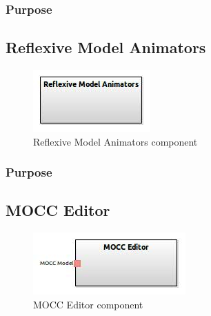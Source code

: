 \documentclass{gemoc} %
\begin{document}
\subsubsection{Purpose}



\subsection{Reflexive Model Animators}

\begin{figure}[htp]
	\begin{center}
	\includegraphics*[trim=0.0cm 0.0cm 0cm 0.0cm, clip=true, scale=1.0]{../images/generated/Generated_Reflexive Model Animators.jpg}
	\caption{Reflexive Model Animators component}
	\end{center}
\end{figure}

\subsubsection{Purpose}



\subsection{MOCC Editor}

\begin{figure}[htp]
	\begin{center}
	\includegraphics*[trim=0.0cm 0.0cm 0cm 0.0cm, clip=true, scale=1.0]{../images/generated/Generated_MOCC Editor.jpg}
	\caption{MOCC Editor component}
	\end{center}
\end{figure}
\end{document}
